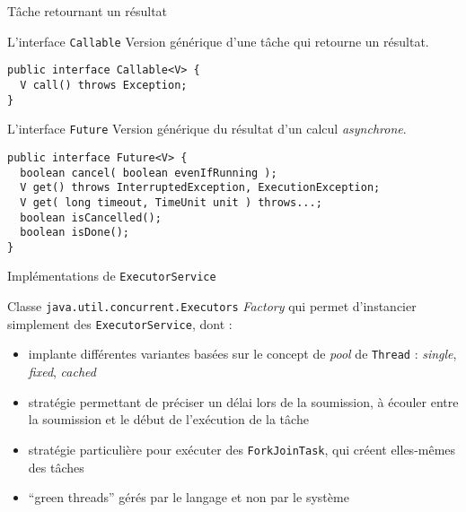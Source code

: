 \begin{frame}[fragile]{Tâche retournant un résultat}

  \begin{block}{L'interface \lstinline{Callable}}
    Version générique d'une tâche qui retourne un résultat.

    \begin{lstlisting}[numbers=none]
public interface Callable<V> {
  V call() throws Exception;
}
    \end{lstlisting}
  \end{block}
  
  \bigskip

  \begin{block}{L'interface \lstinline{Future}}
    Version générique du résultat d'un calcul \textit{asynchrone}. 

    \begin{lstlisting}[numbers=none]
public interface Future<V> {
  boolean cancel( boolean evenIfRunning );
  V get() throws InterruptedException, ExecutionException;
  V get( long timeout, TimeUnit unit ) throws...;
  boolean isCancelled();
  boolean isDone();
}
    \end{lstlisting}
  \end{block}
\end{frame}

\begin{frame}[fragile]{Implémentations de \texttt{ExecutorService}}
  \begin{block}{Classe \lstinline{java.util.concurrent.Executors}}
    \textit{Factory} qui permet d'instancier simplement
    des \lstinline{ExecutorService}, dont :
    \begin{itemize}
    \item {} implante différentes variantes basées sur le concept de \textit{pool} de \lstinline{Thread} : \textit{single}, \textit{fixed}, \textit{cached}
    \item {} stratégie permettant de préciser un délai lors de la soumission, à écouler entre la soumission et le début de l'exécution de la tâche
    \item {} stratégie particulière pour exécuter des \lstinline{ForkJoinTask}, qui créent elles-mêmes des tâches
    \item {} ``green threads'' gérés par le langage et non par le système
    \end{itemize}
  \end{block}
\end{frame}

